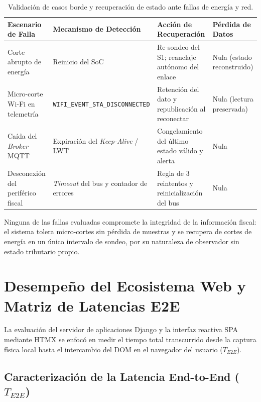 \begin{table}[htbp]
\centering
\caption{Validación de casos borde y recuperación de estado ante fallas de energía y red.}
\label{tab:casos_borde}
\begin{tabularx}{\textwidth}{@{}>{\raggedright\arraybackslash}p{2.8cm} >{\raggedright\arraybackslash}p{4.6cm} >{\raggedright\arraybackslash}X >{\raggedright\arraybackslash}p{2.1cm}@{}}
\toprule
\textbf{Escenario de Falla} & \textbf{Mecanismo de Detección} & \textbf{Acción de Recuperación} & \textbf{Pérdida de Datos} \\
\midrule
Corte abrupto de energía & Reinicio del SoC & Re-sondeo del S1; reanclaje autónomo del enlace & Nula (estado reconstruido) \\
Micro-corte Wi-Fi en telemetría & \texttt{WIFI\_EVENT\_\allowbreak STA\_\allowbreak DISCONNECTED} & Retención del dato y republicación al reconectar & Nula (lectura preservada) \\
Caída del \textit{Broker} MQTT & Expiración del \textit{Keep-Alive} / LWT & Congelamiento del último estado válido y alerta & Nula \\
Desconexión del periférico fiscal & \textit{Timeout} del bus y contador de errores & Regla de $3$ reintentos y reinicialización del bus & Nula \\
\bottomrule
\end{tabularx}
\end{table}

\par Ninguna de las fallas evaluadas compromete la integridad de la información fiscal: el sistema tolera micro-cortes sin pérdida de muestras y se recupera de cortes de energía en un único intervalo de sondeo, por su naturaleza de observador sin estado tributario propio.

\section{Desempeño del Ecosistema Web y Matriz de Latencias E2E}

\par La evaluación del servidor de aplicaciones Django \cite{Django_v5_Doc} y la interfaz reactiva SPA mediante HTMX \cite{HTMX_Doc} se enfocó en medir el tiempo total transcurrido desde la captura física local hasta el intercambio del DOM en el navegador del usuario ($T_{E2E}$).

\subsection{Caracterización de la Latencia End-to-End ($T_{E2E}$)}

